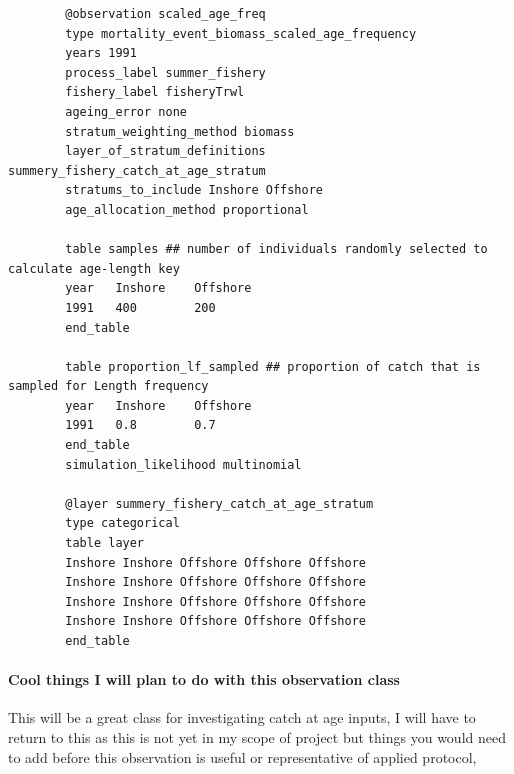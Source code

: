 {\small{\begin{verbatim}
		@observation scaled_age_freq
		type mortality_event_biomass_scaled_age_frequency
		years 1991
		process_label summer_fishery
		fishery_label fisheryTrwl
		ageing_error none
		stratum_weighting_method biomass
		layer_of_stratum_definitions summery_fishery_catch_at_age_stratum
		stratums_to_include Inshore Offshore
		age_allocation_method proportional
		
		table samples ## number of individuals randomly selected to calculate age-length key
		year   Inshore    Offshore
		1991   400        200
		end_table
		
		table proportion_lf_sampled ## proportion of catch that is sampled for Length frequency
		year   Inshore    Offshore
		1991   0.8        0.7
		end_table
		simulation_likelihood multinomial
		
		@layer summery_fishery_catch_at_age_stratum
		type categorical
		table layer 
		Inshore Inshore Offshore Offshore Offshore
		Inshore Inshore Offshore Offshore Offshore
		Inshore Inshore Offshore Offshore Offshore
		Inshore Inshore Offshore Offshore Offshore
		end_table
		\end{verbatim}}}


\paragraph*{Cool things I will plan to do with this observation class}
This will be a great class for investigating catch at age inputs, I will have to return to this as this is not yet in my scope of project but things you would need to add before this observation is useful or representative of applied protocol,

